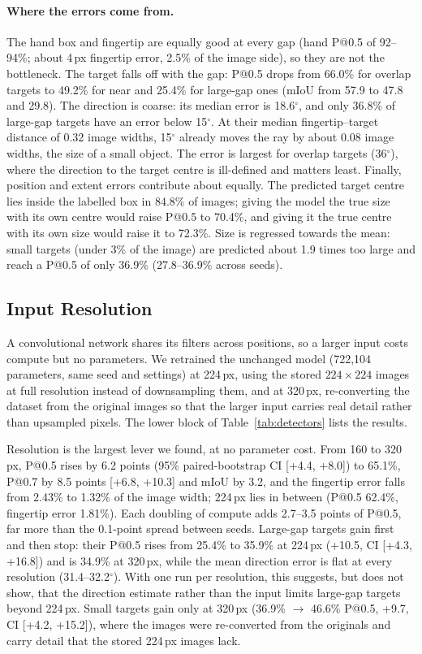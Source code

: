 \paragraph{Where the errors come from.} The hand box and fingertip are equally good at every gap (hand P@0.5 of 92--94\%; about 4\,px fingertip error, 2.5\% of the image side), so they are not the bottleneck. The target falls off with the gap: P@0.5 drops from 66.0\% for overlap targets to 49.2\% for near and 25.4\% for large-gap ones (mIoU from 57.9 to 47.8 and 29.8). The direction is coarse: its median error is 18.6$^\circ$, and only 36.8\% of large-gap targets have an error below 15$^\circ$. At their median fingertip--target distance of 0.32 image widths, 15$^\circ$ already moves the ray by about 0.08 image widths, the size of a small object. The error is largest for overlap targets (36$^\circ$), where the direction to the target centre is ill-defined and matters least. Finally, position and extent errors contribute about equally. The predicted target centre lies inside the labelled box in 84.8\% of images; giving the model the true size with its own centre would raise P@0.5 to 70.4\%, and giving it the true centre with its own size would raise it to 72.3\%. Size is regressed towards the mean: small targets (under 3\% of the image) are predicted about 1.9 times too large and reach a P@0.5 of only 36.9\% (27.8--36.9\% across seeds).

\subsection{Input Resolution}\label{sec:resolution}

A convolutional network shares its filters across positions, so a larger input costs compute but no parameters. We retrained the unchanged model (722,104 parameters, same seed and settings) at 224\,px, using the stored $224\times224$ images at full resolution instead of downsampling them, and at 320\,px, re-converting the dataset from the original images so that the larger input carries real detail rather than upsampled pixels. The lower block of Table~\ref{tab:detectors} lists the results.

Resolution is the largest lever we found, at no parameter cost. From 160 to 320\,px, P@0.5 rises by 6.2 points (95\% paired-bootstrap CI [+4.4, +8.0]) to 65.1\%, P@0.7 by 8.5 points [+6.8, +10.3] and mIoU by 3.2, and the fingertip error falls from 2.43\% to 1.32\% of the image width; 224\,px lies in between (P@0.5 62.4\%, fingertip error 1.81\%). Each doubling of compute adds 2.7--3.5 points of P@0.5, far more than the 0.1-point spread between seeds. Large-gap targets gain first and then stop: their P@0.5 rises from 25.4\% to 35.9\% at 224\,px (+10.5, CI [+4.3, +16.8]) and is 34.9\% at 320\,px, while the mean direction error is flat at every resolution (31.4--32.2$^\circ$). With one run per resolution, this suggests, but does not show, that the direction estimate rather than the input limits large-gap targets beyond 224\,px. Small targets gain only at 320\,px (36.9\% $\to$ 46.6\% P@0.5, +9.7, CI [+4.2, +15.2]), where the images were re-converted from the originals and carry detail that the stored 224\,px images lack.

